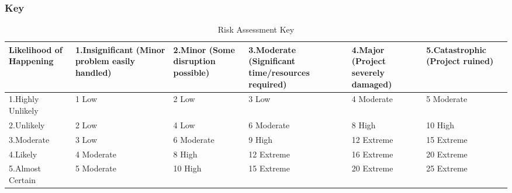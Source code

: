 \documentclass[12pt]{article}
\begin{document}
			
			
			\subsubsection{Key}
				\begin{table}[!htb]
					\begin{center}
						\caption{Risk Assessment Key}
						\label{table:riskassessmentkey}
						\setlength{\aboverulesep}{0pt}
						\setlength{\belowrulesep}{0pt}
						\setlength{\extrarowheight}{.75ex}
						\begin{tabular}{|*{6}{p{2cm}|}}
							\toprule
							Likelihood of Happening & \cellcolor{greenI}1.Insignificant {\scriptsize (Minor problem easily handled)} & \cellcolor{greenII}2.Minor {\scriptsize (Some disruption possible)} & \cellcolor{yellowI}3.Moderate {\scriptsize (Significant time/resources required)} & \cellcolor{orangeI}4.Major {\scriptsize (Project severely damaged)} & \cellcolor{redI}5.Catastrophic {\scriptsize (Project ruined)}\\
							\midrule
							
							\cellcolor{greenI}1.Highly Unlikely & \cellcolor{greenIII}1 Low & \cellcolor{greenIII}2 Low & \cellcolor{greenIII}3 Low & \cellcolor{yellowII}4 Moderate & \cellcolor{yellowII}5 Moderate\\
							\midrule
							
							\cellcolor{greenII} 2.Unlikely & \cellcolor{greenIII}2 Low & \cellcolor{yellowII}4 Low & \cellcolor{yellowII}6 Moderate & \cellcolor{orangeII} 8 High & \cellcolor{orangeII}10 High\\
							\midrule
							
							\cellcolor{yellowI}3.Moderate & \cellcolor{greenIII}3 Low & \cellcolor{yellowII}6 Moderate & \cellcolor{orangeII}9 High & \cellcolor{redII}12 Extreme & \cellcolor{redII}15 Extreme\\
							\midrule
							
							\cellcolor{orangeI}4.Likely & \cellcolor{yellowII}4 Moderate & \cellcolor{orangeII}8 High & \cellcolor{redII}12 Extreme & \cellcolor{redII}16 Extreme & \cellcolor{redII}20 Extreme\\
							\midrule
							
							\cellcolor{redI}5.Almost Certain & \cellcolor{yellowII}5 Moderate & \cellcolor{orangeII}10 High & \cellcolor{redII}15 Extreme & \cellcolor{redII}20 Extreme & \cellcolor{redII}25 Extreme\\
							\bottomrule
						\end{tabular}
					\end{center}
				\end{table}
			    	
\end{document}
